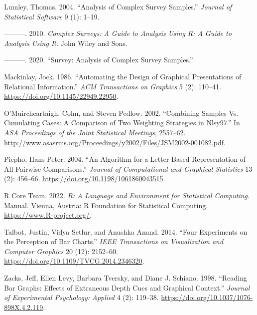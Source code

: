 \documentclass[
]{jds}
\newlength{\cslhangindent}
\newlength{\cslentryspacingunit} %
\newenvironment{CSLReferences}[2] %
 {%
  \setlength{\parindent}{0pt}
  \ifodd #1
  \let\oldpar\par
  \def\par{\hangindent=\cslhangindent\oldpar}
  \fi
  \setlength{\parskip}{#2\cslentryspacingunit}
 }%
 {}
\begin{document}
\begin{CSLReferences}{1}{0}
\leavevmode{}%
Lumley, Thomas. 2004. {``Analysis of Complex Survey Samples.''}
\emph{Journal of Statistical Software} 9 (1): 1--19.

\leavevmode{}%
---------. 2010. \emph{Complex Surveys: {A} Guide to Analysis Using {R}:
{A} Guide to Analysis Using {R}}. {John Wiley and Sons}.

\leavevmode{}%
---------. 2020. {``Survey: Analysis of Complex Survey Samples.''}

\leavevmode{}%
Mackinlay, Jock. 1986. {``Automating the Design of Graphical
Presentations of Relational Information.''} \emph{ACM Transactions on
Graphics} 5 (2): 110--41. \url{https://doi.org/10.1145/22949.22950}.

\leavevmode{}%
O'Muircheartaigh, Colm, and Steven Pedlow. 2002. {``Combining {Samples
Vs}. {Cumulating Cases}: {A Comparison} of {Two Weighting Strategies} in
{Nlsy97}.''} In \emph{{ASA Proceedings} of the {Joint Statistical
Meetings}}, 2557--62.
\url{http://www.asasrms.org/Proceedings/y2002/Files/JSM2002-001082.pdf}.

\leavevmode{}%
Piepho, Hans-Peter. 2004. {``An {Algorithm} for a {Letter-Based
Representation} of {All-Pairwise Comparisons}.''} \emph{Journal of
Computational and Graphical Statistics} 13 (2): 456--66.
\url{https://doi.org/10.1198/1061860043515}.

\leavevmode{}%
R Core Team. 2022. \emph{R: {A} Language and Environment for Statistical
Computing}. Manual. {Vienna, Austria}: {R Foundation for Statistical
Computing}. \url{https://www.R-project.org/}.

\leavevmode{}%
Talbot, Justin, Vidya Setlur, and Anushka Anand. 2014. {``Four
{Experiments} on the {Perception} of {Bar Charts}.''} \emph{IEEE
Transactions on Visualization and Computer Graphics} 20 (12): 2152--60.
\url{https://doi.org/10.1109/TVCG.2014.2346320}.

\leavevmode{}%
Zacks, Jeff, Ellen Levy, Barbara Tversky, and Diane J. Schiano. 1998.
{``Reading Bar Graphs: {Effects} of Extraneous Depth Cues and Graphical
Context.''} \emph{Journal of Experimental Psychology: Applied} 4 (2):
119--38. \url{https://doi.org/10.1037/1076-898X.4.2.119}.

\end{CSLReferences}
\end{document}
